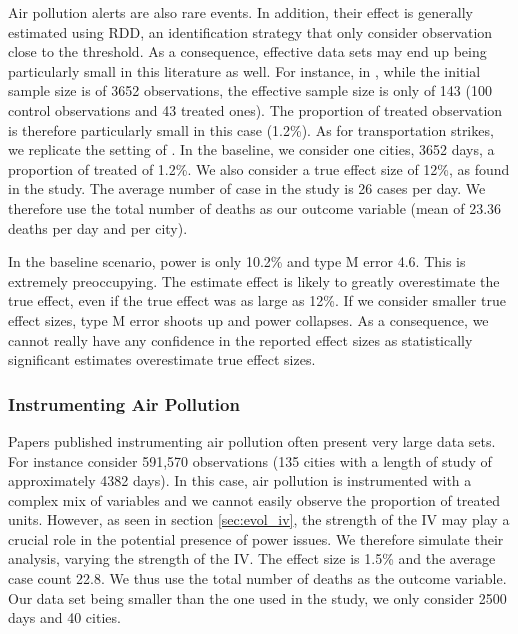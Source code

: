 \documentclass[12pt]{article}
\begin{document}
            Air pollution alerts are also rare events. In addition, their effect is generally estimated using RDD, an identification strategy that only consider observation close to the threshold. As a consequence, effective data sets may end up being particularly small in this literature as well. For instance, in \cite{chen_effect_2018}, while the initial sample size is of 3652 observations, the effective sample size is only of 143 (100 control observations and 43 treated ones). The proportion of treated observation is therefore particularly small in this case (1.2\%). As for transportation strikes, we replicate the setting of \cite{chen_effect_2018}. In the baseline, we consider one cities, 3652 days, a proportion of treated of 1.2\%. We also consider a true effect size of 12\%, as found in the study. The average number of case in the study is 26 cases per day. We therefore use the total number of deaths as our outcome variable (mean of 23.36 deaths per day and per city).
            
            In the baseline scenario, power is only 10.2\% and type M error 4.6. This is extremely preoccupying. The estimate effect is likely to greatly overestimate the true effect, even if the true effect was as large as 12\%. If we consider smaller true effect sizes, type M error shoots up and power collapses. As a consequence, we cannot really have any confidence in the reported effect sizes as statistically significant estimates overestimate true effect sizes. 
            
        
        \subsubsection{Instrumenting Air Pollution}
        
            Papers published instrumenting air pollution often present very large data sets. For instance \cite{schwartz_national_2018} consider 591,570 observations (135 cities with a length of study of approximately 4382 days). In this case, air pollution is instrumented with a complex mix of variables and we cannot easily observe the proportion of treated units. However, as seen in section \ref{sec:evol_iv}, the strength of the IV may play a crucial role in the potential presence of power issues. We therefore simulate their analysis, varying the strength of the IV. The effect size is 1.5\% and the average case count 22.8. We thus use the total number of deaths as the outcome variable. Our data set being smaller than the one used in the study, we only consider 2500 days and 40 cities.%
            
\end{document}
